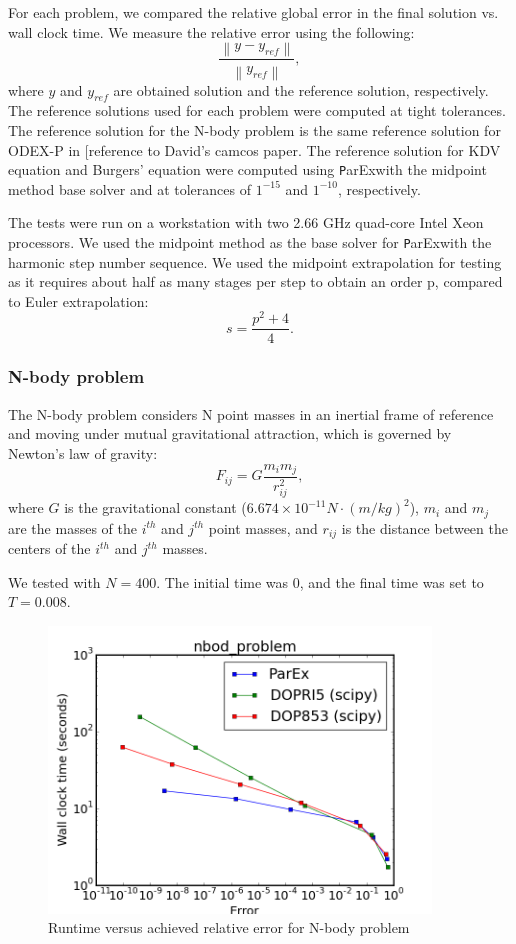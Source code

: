 \documentclass[12pt]{article}
\newcommand{\parex}{\texttt ParEx}
\newcommand\norm[1]{\left\lVert#1\right\rVert}
\begin{document}
For each problem, we compared the relative global error in the final solution vs. wall clock time. We measure the relative error using the following: $$\frac{\norm{y - y_{ref}}}{\norm{y_{ref}}},$$ where $y$ and $y_{ref}$ are obtained solution and the reference solution, respectively. The reference solutions used for each problem were computed at tight tolerances. The reference solution for the N-body problem is the same reference solution for ODEX-P in [reference to David's camcos paper. The reference solution for KDV equation and Burgers' equation were computed using \parex with the midpoint method base solver and at tolerances of $1^{-15}$ and  $1^{-10}$, respectively.

The tests were run on a workstation with two 2.66 GHz quad-core Intel Xeon processors. We used the midpoint method as the base solver for \parex with the harmonic step number sequence. We used the midpoint extrapolation for testing as it requires about half as many stages per step to obtain an order p, compared to Euler extrapolation: $$ s = \frac{p^2 + 4}{4}.$$ 

\subsubsection{N-body problem}
The N-body problem considers N point masses in an inertial frame of reference and moving under mutual gravitational attraction, which is governed by Newton's law of gravity:
$$F_{ij} = G\frac{m_i m_j}{r_{ij}^2},$$
where $G$ is the gravitational constant ($6.674 \times 10^{-11} N \cdot (m/kg)^2$), $m_i$ and $m_j$ are the masses of the $i^{th}$ and $j^{th}$ point masses, and $r_{ij}$ is the distance between the centers of the $i^{th}$ and $j^{th}$ masses.

We tested with $N = 400$. The initial time was 0, and the final time was set to $T = 0.008$.
\begin{figure}[h]
 \includegraphics[width=4in]{images/nbod_problem_err_vs_time.png}
\centering
\caption{Runtime versus achieved relative error for N-body problem}
\end{figure} 
\end{document}
